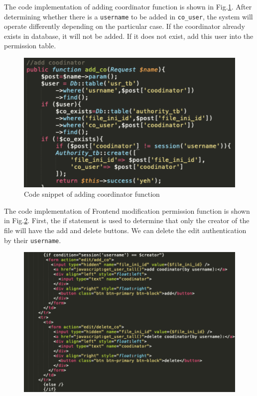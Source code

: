 \noindent The code implementation of adding coordinator function is shown in Fig.\ref{png6}. After determining whether there is a \texttt{username} to be added in \texttt{co\_user}, the system will operate differently depending on the particular case. If the coordinator already exists in database, it will not be added. If it does not exist, add this user into the permission table.
\begin{figure}[H]
  \centering
  \includegraphics[width=.8\textwidth]{addco.png} %
  \caption{Code snippet of adding coordinator function} %
  \label{png6} %
\end{figure}

\noindent The code implementation of Frontend modification permission function is shown in Fig.\ref{png7}. First, the if statement is used to determine that only the creator of the file will have the add and delete buttons. We can delete the edit authentication by their \texttt{username}.
\begin{figure}[H]
  \centering
  \includegraphics[width=.8\textwidth]{qianduan.png} %
  \caption{} %
  \label{png7} %
\end{figure}



